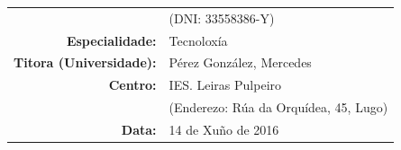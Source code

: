 \begin{titlepage}
\begin{bottompar}
\begin{flushright}
\begin{tabular}{rl}
                              &
                              \small{(DNI: 33558386-Y)} \\

                              \large{\textbf{Especialidade:}}	&
                              \large{Tecnoloxía} \\

			\large{\textbf{Titora (Universidade):}}	&
			\large{Pérez González, Mercedes} \\

			\large{\textbf{Centro:}}	&
			\large{IES. Leiras Pulpeiro} \\

                        & \small{(Enderezo: Rúa da Orquídea, 45, Lugo)} \\

                        \large{\textbf{Data:}} &
                        \large{14 de Xuño de 2016} \\
		\end{tabular}
	\end{flushright}
        \end{bottompar}

\end{titlepage}
